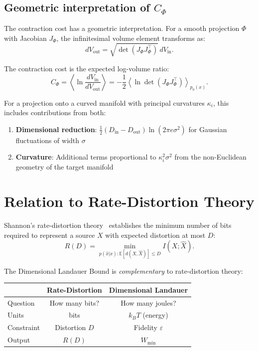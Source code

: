 \documentclass[aps,prx,twocolumn,superscriptaddress,floatfix]{revtex4-2}
\begin{document}
\subsection{Geometric interpretation of $C_\Phi$}

The contraction cost has a geometric interpretation. For a smooth projection $\Phi$ with Jacobian $J_\Phi$, the infinitesimal volume element transforms as:
\begin{equation}
dV_\mathrm{out} = \sqrt{\det(J_\Phi J_\Phi^\top)}\, dV_\mathrm{in}.
\end{equation}

The contraction cost is the expected log-volume ratio:
\begin{equation}
C_\Phi = \left\langle \ln \frac{dV_\mathrm{in}}{dV_\mathrm{out}} \right\rangle = -\frac{1}{2}\left\langle \ln \det(J_\Phi J_\Phi^\top) \right\rangle_{p_0(x)}.
\end{equation}

For a projection onto a curved manifold with principal curvatures $\kappa_i$, this includes contributions from both:
\begin{enumerate}
\item \textbf{Dimensional reduction}: $\frac{1}{2}(D_\mathrm{in} - D_\mathrm{out})\ln(2\pi e \sigma^2)$ for Gaussian fluctuations of width $\sigma$
\item \textbf{Curvature}: Additional terms proportional to $\kappa_i^2 \sigma^2$ from the non-Euclidean geometry of the target manifold
\end{enumerate}

\section{Relation to Rate-Distortion Theory}
\label{app:rate-distortion}

Shannon's rate-distortion theory~\cite{cover2006} establishes the minimum number of bits required to represent a source $X$ with expected distortion at most $D$:
\begin{equation}
R(D) = \min_{p(\hat{x}|x): \mathbb{E}[d(X,\hat{X})] \leq D} I(X; \hat{X}).
\end{equation}

The Dimensional Landauer Bound is \emph{complementary} to rate-distortion theory:

\begin{center}
\begin{tabular}{lcc}
\hline
& \textbf{Rate-Distortion} & \textbf{Dimensional Landauer} \\
\hline
Question & How many bits? & How many joules? \\
Units & bits & $k_B T$ (energy) \\
Constraint & Distortion $D$ & Fidelity $\varepsilon$ \\
Output & $R(D)$ & $W_\mathrm{min}$ \\
\hline
\end{tabular}
\end{center}
\end{document}
